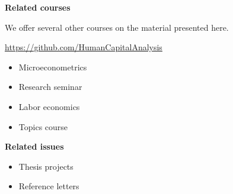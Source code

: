 \begin{frame}
	\textbf{Related courses}\vspace{0.3cm}

We offer several other courses on the material presented here.

	\begin{center}
	\url{https://github.com/HumanCapitalAnalysis}
	\end{center}

	\begin{itemize}\setlength\itemsep{1em}
	\item Microeconometrics
	\item Research seminar
	\item Labor economics
	\item Topics course
	\end{itemize}

\end{frame}
\begin{frame}
	\textbf{Related issues}\vspace{0.3cm}

	\begin{itemize}\setlength\itemsep{1em}
	\item Thesis projects
	\item Reference letters
	\end{itemize}
\end{frame}
